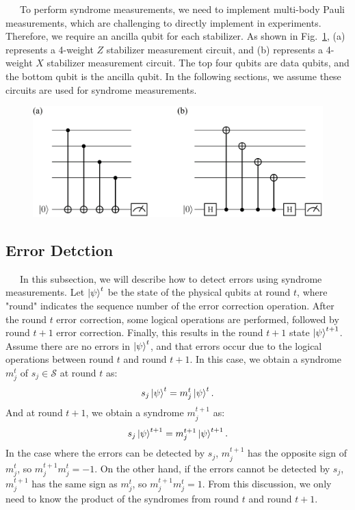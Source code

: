 \documentclass[a4paper,11pt]{ltjsarticle}
\begin{document}
{{{            \ \ \ To perform syndrome measurements, we need to implement multi-body Pauli measurements, which are challenging to directly implement in experiments. Therefore, we require an ancilla qubit for each stabilizer. As shown in Fig.~\ref{syndrome_measurement_circuit}, (a) represents a 4-weight $Z$ stabilizer measurement circuit, and (b) represents a 4-weight $X$ stabilizer measurement circuit. The top four qubits are data qubits, and the bottom qubit is the ancilla qubit. In the following sections, we assume these circuits are used for syndrome measurements.


            \begin{figure}[h]
                \centering
                \includegraphics[scale=0.30]{figure/syndrome_measurement_circuit.eps}
                \vspace{-100pt}\caption{}
                \label{syndrome_measurement_circuit}
                \vspace{-10pt}
            \end{figure}
        }

        \subsection{Error Detction}{
            \ \ \ In this subsection, we will describe how to detect errors using syndrome measurements. Let $\ket{\psi}^t$ be the state of the physical qubits at round $t$, where "round" indicates the sequence number of the error correction operation. After the round $t$ error correction, some logical operations are performed, followed by round $t+1$ error correction. Finally, this results in the round $t+1$ state $\ket{\psi}^{t+1}$. Assume there are no errors in $\ket{\psi}^t$, and that errors occur due to the logical operations between round $t$ and round $t+1$. In this case, we obtain a syndrome $m^t_j$ of $s_j \in \mathcal{S}$ at round $t$ as:
            \begin{align*}
                s_j\ket{\psi}^t=m_j^t\ket{\psi}^t.
            \end{align*}
            And at round $t+1$, we obtain a syndrome $m^{t+1}_j$ as:
            \begin{align*}
                s_j\ket{\psi}^{t+1}=m_j^{t+1}\ket{\psi}^{t+1}.
            \end{align*}
            In the case where the errors can be detected by $s_j$, $m_j^{t+1}$ has the opposite sign of $m_j^t$, so $m_j^{t+1}m_j^t = -1$. On the other hand, if the errors cannot be detected by $s_j$, $m_j^{t+1}$ has the same sign as $m_j^t$, so $m_j^{t+1}m_j^t = 1$. From this discussion, we only need to know the product of the syndromes from round $t$ and round $t+1$.


        }
        



    }
}
\end{document}
